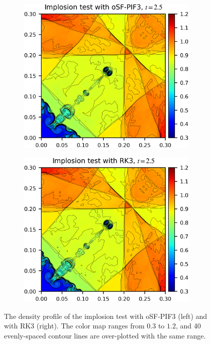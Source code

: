 \begin{figure}
    \centering
    \begin{subfigure}{70mm}
        \centering
        \includegraphics[width=0.95\textwidth]{fig/implosion_osf3.png}
    \end{subfigure}
    \begin{subfigure}{70mm}
        \centering
        \includegraphics[width=0.95\textwidth]{fig/implosion_rk3.png}
    \end{subfigure}
    \caption{The density profile of the implosion test
        with oSF-PIF3 (left) and with RK3 (right).
        The color map ranges from \( 0.3 \) to \( 1.2 \), and
        40 evenly-spaced contour lines are over-plotted with
        the same range.
    }\label{fig:implosion}
\end{figure}

